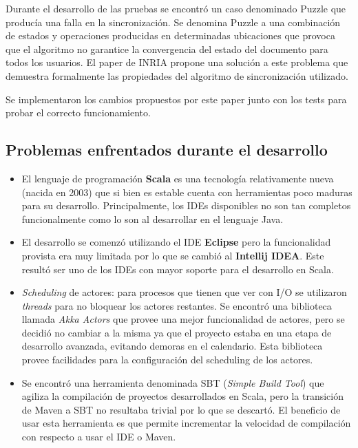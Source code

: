 \documentclass[12pt,a4paper]{article}
\begin{document}
Durante el desarrollo de las pruebas se encontró un caso denominado Puzzle \cite{inria} que producía una falla en la
sincronización. Se denomina Puzzle a una combinación de estados y operaciones producidas en determinadas
ubicaciones que provoca que el algoritmo no garantice la convergencia del estado del documento para todos 
los usuarios. El paper de INRIA \cite{inria} propone una solución a este problema que demuestra formalmente las 
propiedades del algoritmo de sincronización utilizado.

Se implementaron los cambios propuestos por este paper junto con los tests para probar el correcto funcionamiento.


\subsection{Problemas enfrentados durante el desarrollo}

\begin{itemize}
	\item El lenguaje de programación \textbf{Scala} es una tecnología relativamente nueva (nacida en 2003) que
	si bien es estable cuenta con herramientas poco maduras para su desarrollo. Principalmente, los IDEs disponibles
	no son tan completos funcionalmente como lo son al desarrollar en el lenguaje Java.

	\item El desarrollo se comenzó utilizando el IDE \textbf{Eclipse} pero la funcionalidad provista era muy
	limitada por lo que se cambió al \textbf{Intellij IDEA}. Este resultó ser uno de los IDEs con mayor soporte
	para el desarrollo en Scala.

	\item \textit{Scheduling} de actores: para procesos que tienen que ver con I/O se utilizaron \textit{threads}
	para no bloquear los actores restantes. Se encontró una biblioteca llamada \textit{Akka Actors} \cite{akka} que 
	provee una mejor funcionalidad de actores, pero se decidió no cambiar a la misma ya que el proyecto estaba
	en una etapa de desarrollo avanzada, evitando demoras en el calendario. Esta biblioteca provee facilidades
	para la configuración del scheduling de los actores.

    \item Se encontró una herramienta denominada SBT \cite{sbt} (\textit{Simple Build Tool}) que agiliza la compilación
    de proyectos desarrollados en Scala, pero la transición de Maven a SBT no resultaba trivial por lo que
    se descartó. El beneficio de usar esta herramienta es que permite incrementar la velocidad de compilación
    con respecto a usar el IDE o Maven.
    
\end{itemize}
\end{document}
